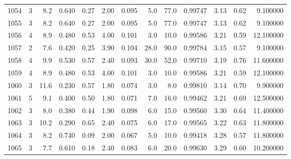 \begin{tabular}{lrrrrrrrrrrrr}
1054 &        3 &            8.2 &             0.640 &         0.27 &            2.00 &      0.095 &                  5.0 &                  77.0 &  0.99747 &  3.13 &       0.62 &   9.100000 \\
1055 &        3 &            8.2 &             0.640 &         0.27 &            2.00 &      0.095 &                  5.0 &                  77.0 &  0.99747 &  3.13 &       0.62 &   9.100000 \\
1056 &        4 &            8.9 &             0.480 &         0.53 &            4.00 &      0.101 &                  3.0 &                  10.0 &  0.99586 &  3.21 &       0.59 &  12.100000 \\
1057 &        2 &            7.6 &             0.420 &         0.25 &            3.90 &      0.104 &                 28.0 &                  90.0 &  0.99784 &  3.15 &       0.57 &   9.100000 \\
1058 &        4 &            9.9 &             0.530 &         0.57 &            2.40 &      0.093 &                 30.0 &                  52.0 &  0.99710 &  3.19 &       0.76 &  11.600000 \\
1059 &        4 &            8.9 &             0.480 &         0.53 &            4.00 &      0.101 &                  3.0 &                  10.0 &  0.99586 &  3.21 &       0.59 &  12.100000 \\
1060 &        3 &           11.6 &             0.230 &         0.57 &            1.80 &      0.074 &                  3.0 &                   8.0 &  0.99810 &  3.14 &       0.70 &   9.900000 \\
1061 &        5 &            9.1 &             0.400 &         0.50 &            1.80 &      0.071 &                  7.0 &                  16.0 &  0.99462 &  3.21 &       0.69 &  12.500000 \\
1062 &        3 &            8.0 &             0.380 &         0.44 &            1.90 &      0.098 &                  6.0 &                  15.0 &  0.99560 &  3.30 &       0.64 &  11.400000 \\
1063 &        3 &           10.2 &             0.290 &         0.65 &            2.40 &      0.075 &                  6.0 &                  17.0 &  0.99565 &  3.22 &       0.63 &  11.800000 \\
1064 &        3 &            8.2 &             0.740 &         0.09 &            2.00 &      0.067 &                  5.0 &                  10.0 &  0.99418 &  3.28 &       0.57 &  11.800000 \\
1065 &        3 &            7.7 &             0.610 &         0.18 &            2.40 &      0.083 &                  6.0 &                  20.0 &  0.99630 &  3.29 &       0.60 &  10.200000 \\

\end{tabular}
